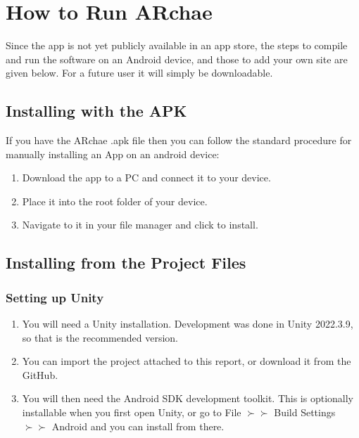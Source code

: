 \documentclass[12pt, a4paper]{article}
\begin{document}
\newpage


\newpage
\appendix

\section{How to Run ARchae}
\label{howtorun}
Since the app is not yet publicly available in an app store, the steps to compile and run the software on an Android device, and those to add your own site are given below. For a future user it will simply be downloadable.

\subsection{Installing with the APK}
If you have the ARchae .apk file then you can follow the standard procedure for manually installing an App on an android device:

\begin{enumerate}
    \item Download the app to a PC and connect it to your device.
    \item Place it into the root folder of your device.
    \item Navigate to it in your file manager and click to install.
\end{enumerate}

\subsection{Installing from the Project Files}

\subsubsection{Setting up Unity}
\begin{enumerate}
    \item You will need a Unity installation. Development was done in Unity 2022.3.9, so that is the recommended version.
    \item You can import the project attached to this report, or download it from the GitHub.
    \item You will then need the Android SDK development toolkit. This is optionally installable when you first open Unity, or go to File $\succ\succ$ Build Settings $\succ\succ$ Android and you can install from there.
\end{enumerate}
\end{document}
